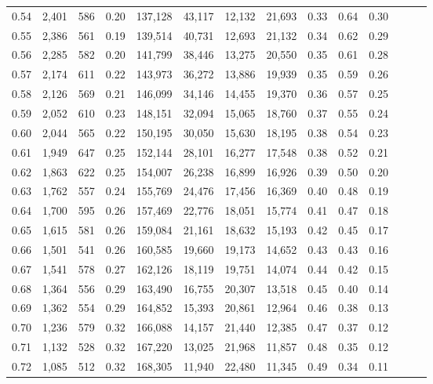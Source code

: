 \begin{tabular}{rrrrrrrrrrrrrr}
0.54 &  2,401 &    586 &  0.20 &  137,128 &   43,117 &  12,132 &  21,693 &  0.33 &  0.64 &      0.30 \\
0.55 &  2,386 &    561 &  0.19 &  139,514 &   40,731 &  12,693 &  21,132 &  0.34 &  0.62 &      0.29 \\
0.56 &  2,285 &    582 &  0.20 &  141,799 &   38,446 &  13,275 &  20,550 &  0.35 &  0.61 &      0.28 \\
0.57 &  2,174 &    611 &  0.22 &  143,973 &   36,272 &  13,886 &  19,939 &  0.35 &  0.59 &      0.26 \\
0.58 &  2,126 &    569 &  0.21 &  146,099 &   34,146 &  14,455 &  19,370 &  0.36 &  0.57 &      0.25 \\
0.59 &  2,052 &    610 &  0.23 &  148,151 &   32,094 &  15,065 &  18,760 &  0.37 &  0.55 &      0.24 \\
0.60 &  2,044 &    565 &  0.22 &  150,195 &   30,050 &  15,630 &  18,195 &  0.38 &  0.54 &      0.23 \\
0.61 &  1,949 &    647 &  0.25 &  152,144 &   28,101 &  16,277 &  17,548 &  0.38 &  0.52 &      0.21 \\
0.62 &  1,863 &    622 &  0.25 &  154,007 &   26,238 &  16,899 &  16,926 &  0.39 &  0.50 &      0.20 \\
0.63 &  1,762 &    557 &  0.24 &  155,769 &   24,476 &  17,456 &  16,369 &  0.40 &  0.48 &      0.19 \\
0.64 &  1,700 &    595 &  0.26 &  157,469 &   22,776 &  18,051 &  15,774 &  0.41 &  0.47 &      0.18 \\
0.65 &  1,615 &    581 &  0.26 &  159,084 &   21,161 &  18,632 &  15,193 &  0.42 &  0.45 &      0.17 \\
0.66 &  1,501 &    541 &  0.26 &  160,585 &   19,660 &  19,173 &  14,652 &  0.43 &  0.43 &      0.16 \\
0.67 &  1,541 &    578 &  0.27 &  162,126 &   18,119 &  19,751 &  14,074 &  0.44 &  0.42 &      0.15 \\
0.68 &  1,364 &    556 &  0.29 &  163,490 &   16,755 &  20,307 &  13,518 &  0.45 &  0.40 &      0.14 \\
0.69 &  1,362 &    554 &  0.29 &  164,852 &   15,393 &  20,861 &  12,964 &  0.46 &  0.38 &      0.13 \\
0.70 &  1,236 &    579 &  0.32 &  166,088 &   14,157 &  21,440 &  12,385 &  0.47 &  0.37 &      0.12 \\
0.71 &  1,132 &    528 &  0.32 &  167,220 &   13,025 &  21,968 &  11,857 &  0.48 &  0.35 &      0.12 \\
0.72 &  1,085 &    512 &  0.32 &  168,305 &   11,940 &  22,480 &  11,345 &  0.49 &  0.34 &      0.11 \\

\end{tabular}
